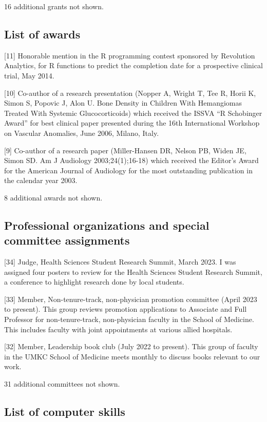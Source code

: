 \documentclass[
  12pt,
]{article}
\begin{document}
16 additional grants not shown.

\subsection{List of awards}\label{list-of-awards}

{[}11{]} Honorable mention in the R programming contest sponsored by
Revolution Analytics, for R functions to predict the completion date for
a prospective clinical trial, May 2014.

{[}10{]} Co-author of a research presentation (Nopper A, Wright T, Tee
R, Horii K, Simon S, Popovic J, Alon U. Bone Density in Children With
Hemangiomas Treated With Systemic Glucocorticoids) which received the
ISSVA ``R Schobinger Award'' for best clinical paper presented during
the 16th International Workshop on Vascular Anomalies, June 2006,
Milano, Italy.

{[}9{]} Co-author of a research paper (Miller-Hansen DR, Nelson PB,
Widen JE, Simon SD. Am J Audiology 2003;24(1);16-18) which received the
Editor's Award for the American Journal of Audiology for the most
outstanding publication in the calendar year 2003.

8 additional awards not shown.

\subsection{Professional organizations and special committee
assignments}\label{professional-organizations-and-special-committee-assignments}

{[}34{]} Judge, Health Sciences Student Research Summit, March 2023. I
was assigned four posters to review for the Health Sciences Student
Research Summit, a conference to highlight research done by local
students.

{[}33{]} Member, Non-tenure-track, non-physician promotion committee
(April 2023 to present). This group reviews promotion applications to
Associate and Full Professor for non-tenure-track, non-physician faculty
in the School of Medicine. This includes faculty with joint appointments
at various allied hospitals.

{[}32{]} Member, Leadership book club (July 2022 to present). This group
of faculty in the UMKC School of Medicine meets monthly to discuss books
relevant to our work.

31 additional committees not shown.

\subsection{List of computer skills}\label{list-of-computer-skills}
\end{document}
